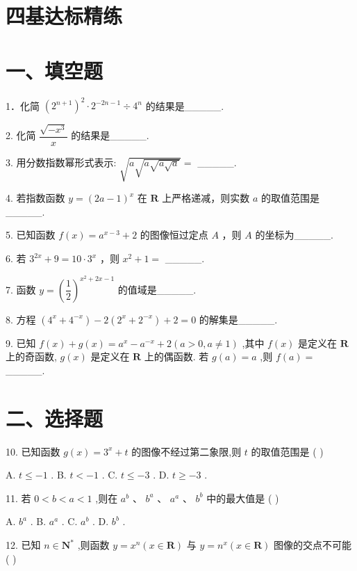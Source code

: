 \section*{四基达标精练}

\section*{一、填空题}

1．化简 ${\left( {2}^{n + 1}\right) }^{2} \cdot  {2}^{-{2n} - 1} \div  {4}^{n}$ 的结果是\_\_\_\_\_.

2. 化简 $\dfrac{\sqrt{-{x}^{3}}}{x}$ 的结果是\_\_\_\_\_.

3. 用分数指数幂形式表示: $\sqrt{a\sqrt{a\sqrt{a\sqrt{a}}}} =$ \_\_\_\_\_.

4. 若指数函数 $y = {\left( 2a - 1\right) }^{x}$ 在 $\mathbf{R}$ 上严格递减，则实数 $a$ 的取值范围是\_\_\_\_\_.

5. 已知函数 $f\left( x\right)  = {a}^{x - 3} + 2$ 的图像恒过定点 $A$ ，则 $A$ 的坐标为\_\_\_\_\_.

6. 若 ${3}^{2x} + 9 = {10} \cdot  {3}^{x}$ ，则 ${x}^{2} + 1 =$ \_\_\_\_\_.

7. 函数 $y = {\left( \dfrac{1}{2}\right) }^{{x}^{2} + {2x} - 1}$ 的值域是\_\_\_\_\_.

8. 方程 $\left( {{4}^{x} + {4}^{-x}}\right)  - 2\left( {{2}^{x} + {2}^{-x}}\right)  + 2 = 0$ 的解集是\_\_\_\_\_.

9. 已知 $f\left( x\right)  + g\left( x\right)  = {a}^{x} - {a}^{-x} + 2\left( {a > 0,a \neq  1}\right)$ ,其中 $f\left( x\right)$ 是定义在 $\mathbf{R}$ 上的奇函数, $g\left( x\right)$ 是定义在 $\mathbf{R}$ 上的偶函数. 若 $g\left( a\right)  = a$ ,则 $f\left( a\right)  =$ \_\_\_\_\_.

\section*{二、选择题}

10. 已知函数 $g\left( x\right)  = {3}^{x} + t$ 的图像不经过第二象限,则 $t$ 的取值范围是 ( )

A. $t \leq   - 1$ . B. $t <  - 1$ . C. $t \leq   - 3$ . D. $t \geq   - 3$ .

11. 若 $0 < b < a < 1$ ,则在 ${a}^{b}$ 、 ${b}^{a}$ 、 ${a}^{a}$ 、 ${b}^{b}$ 中的最大值是 ( )

A. ${b}^{a}$ . B. ${a}^{a}$ . C. ${a}^{b}$ . D. ${b}^{b}$ .

12. 已知 $n \in  {\mathbf{N}}^{ * }$ ,则函数 $y = {x}^{n}\left( {x \in  \mathbf{R}}\right)$ 与 $y = {n}^{x}\left( {x \in  \mathbf{R}}\right)$ 图像的交点不可能 ( )

